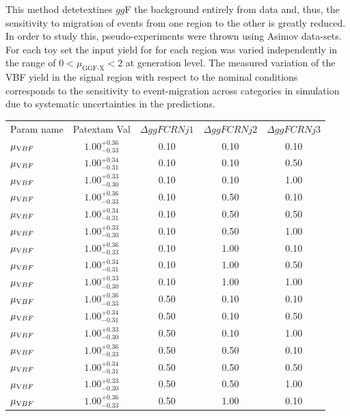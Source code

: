 This method detetextines $gg$F the background entirely from data and, thus, the sensitivity to migration of events from one region to the other is greatly reduced. In order to study this, pseudo-experiments were thrown using Asimov data-sets. For each toy set the input yield for for each region was varied independently in the range of $0<\mu_{\text{GGF-X}}<2$ at generation level. The measured variation of the VBF yield in the signal region with respect to the nominal conditions corresponds to the sensitivity to event-migration across categories in simulation due to systematic uncertainties in the predictions. 


\begin{table}
\centering
\begin{tabular}{l c c c c}
Param name & Patextam Val &  $\Delta{ggFCRNj1}$ & $\Delta{ggFCRNj2}$ & $\Delta{ggFCRNj3}$ \\
$\mu_{\text VBF}$ &  $1.00^{+0.36}_{-0.33}$ & 0.10 & 0.10 & 0.10 \\ 
$\mu_{\text VBF}$ &  $1.00^{+0.34}_{-0.31}$ & 0.10 & 0.10 & 0.50 \\ 
$\mu_{\text VBF}$ &  $1.00^{+0.33}_{-0.30}$ & 0.10 & 0.10 & 1.00 \\ 
$\mu_{\text VBF}$ &  $1.00^{+0.36}_{-0.33}$ & 0.10 & 0.50 & 0.10 \\ 
$\mu_{\text VBF}$ &  $1.00^{+0.34}_{-0.31}$ & 0.10 & 0.50 & 0.50 \\ 
$\mu_{\text VBF}$ &  $1.00^{+0.33}_{-0.30}$ & 0.10 & 0.50 & 1.00 \\ 
$\mu_{\text VBF}$ &  $1.00^{+0.36}_{-0.33}$ & 0.10 & 1.00 & 0.10 \\ 
$\mu_{\text VBF}$&  $1.00^{+0.34}_{-0.31}$ & 0.10 & 1.00 & 0.50 \\ 
$\mu_{\text VBF}$&  $1.00^{+0.33}_{-0.30}$ & 0.10 & 1.00 & 1.00 \\ 
$\mu_{\text VBF}$&  $1.00^{+0.36}_{-0.33}$ & 0.50 & 0.10 & 0.10 \\ 
$\mu_{\text VBF}$&  $1.00^{+0.34}_{-0.31}$ & 0.50 & 0.10 & 0.50 \\ 
$\mu_{\text VBF}$&  $1.00^{+0.33}_{-0.30}$ & 0.50 & 0.10 & 1.00 \\ 
$\mu_{\text VBF}$&  $1.00^{+0.36}_{-0.33}$ & 0.50 & 0.50 & 0.10 \\ 
$\mu_{\text VBF}$&  $1.00^{+0.34}_{-0.31}$ & 0.50 & 0.50 & 0.50 \\ 
$\mu_{\text VBF}$&  $1.00^{+0.33}_{-0.30}$ & 0.50 & 0.50 & 1.00 \\ 
$\mu_{\text VBF}$&  $1.00^{+0.36}_{-0.33}$ & 0.50 & 1.00 & 0.10 \\ 

\end{tabular}
\end{table}
